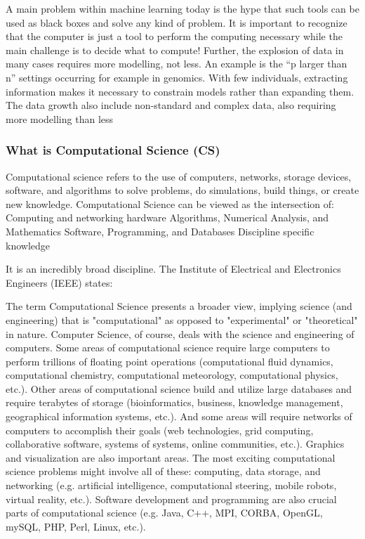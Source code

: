 \documentclass[a4paper,10pt]{article}
\begin{document}
A main problem within machine learning today is the hype that such tools can be used as black boxes and solve any kind of problem. It is important to recognize that the computer is just a tool to perform the computing necessary while the main challenge is to decide what to compute!
Further, the explosion of data in many cases requires more modelling, not less. An example is the “p larger than n” settings occurring for example in genomics. With few individuals, extracting information makes it necessary to constrain models rather than expanding them.
The data growth also include non-standard and complex data, also requiring more modelling than less






 
\subsubsection*{What is Computational Science (CS)}
Computational science refers to the use of computers, networks, storage devices, software, and algorithms to solve problems, do simulations, build things, or create new knowledge. Computational Science can be viewed as the intersection of: 
Computing and networking hardware
Algorithms, Numerical Analysis, and Mathematics
Software, Programming, and Databases
Discipline specific knowledge

It is an incredibly broad discipline. The Institute of Electrical and Electronics Engineers (IEEE) states: 

The term Computational Science presents a broader view, implying science (and engineering) that is "computational" as opposed to "experimental" or "theoretical" in nature. Computer Science, of course, deals with the science and engineering of computers. 
Some areas of computational science require large computers to perform trillions of floating point operations (computational fluid dynamics, computational chemistry, computational meteorology, computational physics, etc.). Other areas of computational science build and utilize large databases and require terabytes of storage (bioinformatics, business, knowledge management, geographical information systems, etc.). And some areas will require networks of computers to accomplish their goals (web technologies, grid computing, collaborative software, systems of systems, online communities, etc.). Graphics and visualization are also important areas. The most exciting computational science problems might involve all of these: computing, data storage, and networking (e.g. artificial intelligence, computational steering, mobile robots, virtual reality, etc.). Software development and programming are also crucial parts of computational science (e.g. Java, C++, MPI, CORBA, OpenGL, mySQL, PHP, Perl, Linux, etc.). 
\end{document}
